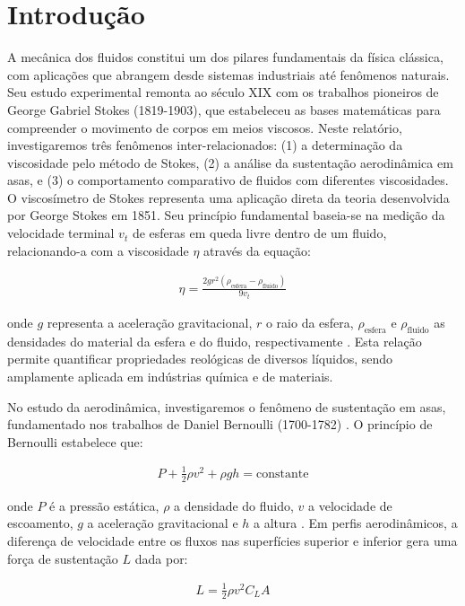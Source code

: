 \section{Introdução}
A mecânica dos fluidos constitui um dos pilares fundamentais da física clássica, com aplicações que abrangem desde sistemas industriais até fenômenos naturais. Seu estudo experimental remonta ao século XIX com os trabalhos pioneiros de George Gabriel Stokes (1819-1903)\cite{araujo}, que estabeleceu as bases matemáticas para compreender o movimento de corpos em meios viscosos. Neste relatório, investigaremos três fenômenos inter-relacionados: (1) a determinação da viscosidade pelo método de Stokes, (2) a análise da sustentação aerodinâmica em asas, e (3) o comportamento comparativo de fluidos com diferentes viscosidades.
O viscosímetro de Stokes representa uma aplicação direta da teoria desenvolvida por George Stokes em 1851. Seu princípio fundamental baseia-se na medição da velocidade terminal $v_t$ de esferas em queda livre dentro de um fluido, relacionando-a com a viscosidade $\eta$ através da equação:


\begin{align*}
        \eta = \frac{2 g r^2 (\rho_{\text{esfera}} - \rho_{\text{fluido}})}{9 v_t}
\end{align*}

onde $g$ representa a aceleração gravitacional, $r$ o raio da esfera, $\rho_{\text{esfera}}$ e $\rho_{\text{fluido}}$ as densidades do material da esfera e do fluido, respectivamente \cite{Munson2004-tl}. Esta relação permite quantificar propriedades reológicas de diversos líquidos, sendo amplamente aplicada em indústrias química e de materiais.

No estudo da aerodinâmica, investigaremos o fenômeno de sustentação em asas, fundamentado nos trabalhos de Daniel Bernoulli (1700-1782) \cite{moyses}. O princípio de Bernoulli estabelece que:

\begin{align*}
        P + \frac{1}{2} \rho v^2 + \rho gh = \text{constante}
\end{align*}

onde $P$ é a pressão estática, $\rho$ a densidade do fluido, $v$ a velocidade de escoamento, $g$ a aceleração gravitacional e $h$ a altura \cite{Munson2004-tl}. Em perfis aerodinâmicos, a diferença de velocidade entre os fluxos nas superfícies superior e inferior gera uma força de sustentação $L$ dada por:

\begin{align*}
       L = \frac{1}{2} \rho v^2 C_L A
\end{align*}

